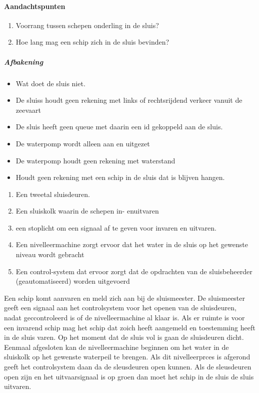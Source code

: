 \paragraph{Aandachtspunten}
\begin{enumerate}
	\item Voorrang tussen schepen onderling in de sluis?
	\item Hoe lang mag een schip zich in de sluis bevinden?
\end{enumerate} 




\subparagraph{Afbakening}
\begin{itemize}
	\item Wat doet de sluis niet.
	\item De sluiss houdt geen rekening met links of rechtsrijdend verkeer vanuit de zeevaart
	\item De sluis heeft geen queue met daarin een id gekoppeld aan de sluis.
	\item De waterpomp wordt alleen aan en uitgezet
	\item De waterpomp houdt geen rekening met waterstand
	\item Houdt geen rekening met een schip in de sluis dat is blijven hangen.
\end{itemize}


\begin{enumerate}
	\item Een tweetal sluisdeuren. 
	\item Een sluiskolk waarin de schepen in- enuitvaren
	\item een stoplicht om een signaal af te geven voor invaren en uitvaren.
	\item Een nivelleermachine zorgt ervoor dat het water in de sluis op het gewenste niveau wordt gebracht
	\item Een control-system dat ervoor zorgt dat de opdrachten van de sluisbeheerder (geautomatiseerd) worden uitgevoerd
\end{enumerate}

Een schip komt aanvaren en meld zich aan bij de sluismeester. De sluismeester geeft een signaal aan het controlsystem voor het openen van de sluisdeuren, nadat geccontroleerd is of de nivelleermachine al klaar is. Als er ruimte is voor een invarend schip mag het schip dat zoich heeft aangemeld en toestemming heeft  in de sluis varen. Op het moment dat de sluis vol is gaan de sluisdeuren dicht. Eenmaal afgesloten kan de nivelleermachine beginnen om het water in de sluiskolk op het gewenste waterpeil te brengen. Als dit nivelleerprces is afgerond geeft  het controlsystem daan da de sleusdeuren open kunnen.  Als de sleusdeuren open zijn en het uitvaarsignaal is op groen dan moet het schip in de sluis de sluis uitvaren.

